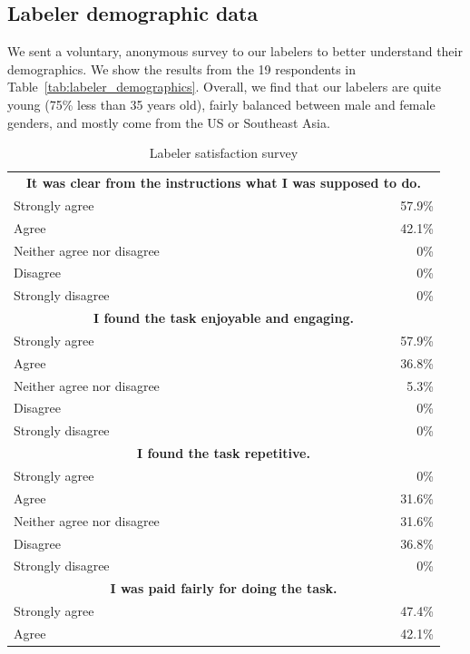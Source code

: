 \subsection{Labeler demographic data}

We sent a voluntary, anonymous survey to our labelers to better understand their demographics. We show the results from the 19 respondents in Table~\ref{tab:labeler_demographics}. Overall, we find that our labelers are quite young (75\% less than 35 years old), fairly balanced between male and female genders, and mostly come from the US or Southeast Asia.


\begin{table}[]
    \centering
    \caption{Labeler satisfaction survey}
    \label{tab:labeler_satisfaction}
    \begin{tabular}{l r}
    \toprule 
        \multicolumn{2}{c}{~~\textbf{It was clear from the instructions what I was supposed to do.}~~}\\
         Strongly agree & 57.9\% \\
         Agree & 42.1\% \\
         Neither agree nor disagree  & 0\% \\
         Disagree & 0\% \\
         Strongly disagree  & 0\% \\ \midrule 
         \multicolumn{2}{c}{\textbf{I found the task enjoyable and engaging.}}\\
         Strongly agree & 57.9\% \\
         Agree & 36.8\% \\
         Neither agree nor disagree  & 5.3\% \\
         Disagree & 0\% \\
         Strongly disagree  & 0\% \\ \midrule
         \multicolumn{2}{c}{\textbf{I found the task repetitive.}}\\
         Strongly agree & 0\% \\
         Agree & 31.6\% \\
         Neither agree nor disagree  & 31.6\% \\
         Disagree & 36.8\% \\
         Strongly disagree  & 0\% \\ \midrule
         \multicolumn{2}{c}{\textbf{I was paid fairly for doing the task.}}\\
         Strongly agree & 47.4\% \\
         Agree & 42.1\% \\

\end{tabular}
\end{table}
